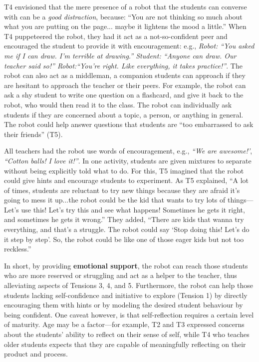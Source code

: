 T4 envisioned that the mere presence of a robot that the students can converse with can be a \textit{good distraction}, because: ``You are not thinking so much about what you are putting on the page... maybe it lightens the mood a little.''  When T4 puppeteered the robot, they had it act as a not-so-confident peer and encouraged the student to provide it with encouragement: e.g., \textit{Robot: ``You asked me if I can draw.  I'm terrible at drawing.''  Student: ``Anyone can draw.  Our teacher said so!'' Robot:``You're right.  Like everything, it takes practice!''}. The robot can also act as a middleman, a companion students can approach if they are hesitant to approach the teacher or their peers.  For example, the robot can ask a shy student to write one question on a flashcard, and give it back to the robot, who would then read it to the class.  The robot can individually ask students if they are concerned about a topic, a person, or anything in general.  The robot could help answer questions that students are ``too embarrassed to ask their friends'' (T5).  

All teachers had the robot use words of encouragement, e.g., \textit{``We are awesome!'}, \textit{``Cotton balls! I love it!''}. In one activity, students are given mixtures to separate without being explicitly told what to do.  For this, T5 imagined that the robot could give hints and encourage students to experiment.  As T5 explained, ``A lot of times, students are reluctant to try new things because they are afraid it's going to mess it up...the robot could be the kid that wants to try lots of things---Let's use this!  Let's try this and see what happens!  Sometimes he gets it right, and sometimes he gets it wrong.'' They added, ``There are kids that wanna try everything, and that's a struggle. The robot could say `Stop doing this! Let's do it step by step'.  So, the robot could be like one of those eager kids but not too reckless.''



In short, by providing \textbf{emotional support}, the robot can reach those students who are more reserved or struggling and act as a helper to the teacher, thus alleviating aspects of Tensions 3, 4, and 5. Furthermore, the robot can help those students lacking self-confidence and initiative to explore (Tension 1) by directly encouraging them with hints or by modeling the desired student behaviour by being confident. One caveat however, is that self-reflection requires a certain level of maturity. Age may be a factor---for example, T2 and T3 expressed concerns about the students' ability to reflect on their sense of self, while T4 who teaches older students expects that they are capable of meaningfully reflecting on their product and process.   







